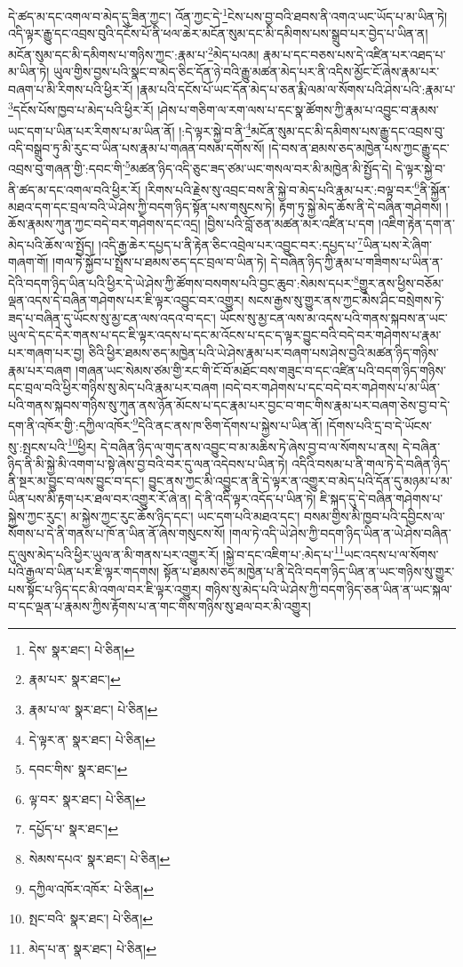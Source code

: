 དེ་ཚད་མ་དང་འགལ་བ་མེད་དུ་ཟིན་ཀྱང་། འོན་ཀྱང་དེ་\footnote{དེས་  སྣར་ཐང་།  པེ་ཅིན། }ངེས་པས་བྱ་བའི་ཐབས་ནི་འགའ་ཡང་ཡོད་པ་མ་ཡིན་ཏེ། འདི་ལྟར་རྒྱུ་དང་འབྲས་བུའི་དངོས་པོ་ནི་ཕལ་ཆེར་མངོན་སུམ་དང་མི་དམིགས་པས་སྒྲུབ་པར་བྱེད་པ་ཡིན་ན། མངོན་སུམ་དང་མི་དམིགས་པ་གཉིས་ཀྱང་:རྣམ་པ་\footnote{རྣམ་པར་  སྣར་ཐང་། }མེད་པའམ། རྣམ་པ་དང་བཅས་པས་དེ་འཛིན་པར་འཐད་པ་མ་ཡིན་ཏེ། ཡུལ་གྱིས་བྱས་པའི་སྣང་བ་མེད་ཅིང་དོན་ཉེ་བའི་རྒྱུ་མཚན་མེད་པར་ནི་འདིས་མྱོང་ངོ་ཞེས་རྣམ་པར་བཞག་པ་མི་རིགས་པའི་ཕྱིར་རོ། །རྣམ་པའི་དངོས་པོ་ཡང་དོན་མེད་པ་ཅན་རྨི་ལམ་ལ་སོགས་པའི་ཤེས་པའི་:རྣམ་པ་\footnote{རྣམ་པ་ལ་  སྣར་ཐང་།  པེ་ཅིན། }དངོས་པོས་ཁྱབ་པ་མེད་པའི་ཕྱིར་རོ། །ཤེས་པ་གཅིག་ལ་རག་ལས་པ་དང་སྣ་ཚོགས་ཀྱི་རྣམ་པ་འབྱུང་བ་རྣམས་ཡང་དག་པ་ཡིན་པར་རིགས་པ་མ་ཡིན་ནོ། །:དེ་ལྟར་སྐྱེ་བ་ནི་\footnote{དེ་ལྟར་ན་  སྣར་ཐང་།  པེ་ཅིན། }མངོན་སུམ་དང་མི་དམིགས་པས་རྒྱུ་དང་འབྲས་བུ་འདི་བསྒྲུབ་ཏུ་མི་རུང་བ་ཡིན་པས་རྣམ་པ་གཞན་བསམ་དགོས་སོ། །དེ་བས་ན་ཐམས་ཅད་མཁྱེན་པས་ཀྱང་རྒྱུ་དང་འབྲས་བུ་གཞན་གྱི་:དབང་གི་\footnote{དབང་གིས་  སྣར་ཐང་། }མཚན་ཉིད་འདི་ཅུང་ཟད་ཙམ་ཡང་གསལ་བར་མི་མཁྱེན་མི་སྤྱོད་དེ། དེ་ལྟར་སྐྱེ་བ་ནི་ཚད་མ་དང་འགལ་བའི་ཕྱིར་རོ། །རིགས་པའི་རྗེས་སུ་འབྲང་བས་ནི་སྐྱེ་བ་མེད་པའི་རྣམ་པར་:བལྟ་བར་\footnote{ལྟ་བར་  སྣར་ཐང་།  པེ་ཅིན། }ནི་སྐྱོན་མཐའ་དག་དང་བྲལ་བའི་ཡེ་ཤེས་ཀྱི་བདག་ཉིད་སྟོན་པས་གསུངས་ཏེ། རྟག་ཏུ་སྐྱེ་མེད་ཆོས་ནི་དེ་བཞིན་གཤེགས། །ཆོས་རྣམས་ཀུན་ཀྱང་བདེ་བར་གཤེགས་དང་འདྲ། །བྱིས་པའི་བློ་ཅན་མཚན་མར་འཛིན་པ་དག །འཇིག་རྟེན་དག་ན་མེད་པའི་ཆོས་ལ་སྤྱོད། །འདི་རྒྱ་ཆེར་དཔྱད་པ་ནི་རྟེན་ཅིང་འབྲེལ་པར་འབྱུང་བར་:དཔྱད་པ་\footnote{དཔྱོད་པ་  སྣར་ཐང་། }ཡིན་པས་རེ་ཞིག་གཞག་གོ། །གལ་ཏེ་སྐྱོབ་པ་སྤྲོས་པ་ཐམས་ཅད་དང་བྲལ་བ་ཡིན་ཏེ། དེ་བཞིན་ཉིད་ཀྱི་རྣམ་པ་གཟིགས་པ་ཡིན་ན་དེའི་བདག་ཉིད་ཡིན་པའི་ཕྱིར་དེ་ཡེ་ཤེས་ཀྱི་ཚོགས་བསགས་པའི་བྱང་ཆུབ་:སེམས་དཔར་\footnote{སེམས་དཔའ་  སྣར་ཐང་།  པེ་ཅིན། }གྱུར་ནས་ཕྱིས་བཅོམ་ལྡན་འདས་དེ་བཞིན་གཤེགས་པར་ཇི་ལྟར་འབྱུང་བར་འགྱུར། སངས་རྒྱས་སུ་གྱུར་ནས་ཀྱང་མེས་ཤིང་བསྲེགས་ཏེ་ཟད་པ་བཞིན་དུ་ཡོངས་སུ་མྱ་ངན་ལས་འདའ་བ་དང་། ཡོངས་སུ་མྱ་ངན་ལས་མ་འདས་པའི་གནས་སྐབས་ན་ཡང་ཡུལ་དེ་དང་དེར་གནས་པ་དང་ཇི་ལྟར་འདས་པ་དང་མ་འོངས་པ་དང་ད་ལྟར་བྱུང་བའི་བདེ་བར་གཤེགས་པ་རྣམ་པར་གཞག་པར་བྱ། ཅིའི་ཕྱིར་ཐམས་ཅད་མཁྱེན་པའི་ཡེ་ཤེས་རྣམ་པར་བཞག་པས་ཤེས་བྱའི་མཚན་ཉིད་གཉིས་རྣམ་པར་བཞག །གཞན་ཡང་སེམས་ཙམ་གྱི་རང་གི་ངོ་བོ་མཐོང་བས་གཟུང་བ་དང་འཛིན་པའི་བདག་ཉིད་གཉིས་དང་བྲལ་བའི་ཕྱིར་གཉིས་སུ་མེད་པའི་རྣམ་པར་བཞག །བདེ་བར་གཤེགས་པ་དང་བདེ་བར་གཤེགས་པ་མ་ཡིན་པའི་གནས་སྐབས་གཉིས་སུ་ཀུན་ནས་ཉོན་མོངས་པ་དང་རྣམ་པར་བྱང་བ་གང་གིས་རྣམ་པར་བཞག་ཅེས་བྱ་བ་དེ་དག་ནི་འཁོར་གྱི་:དཀྱིལ་འཁོར་\footnote{དཀྱིལ་འཁོར་འཁོར་  པེ་ཅིན། }དེའི་ནང་ནས་ཁ་ཅིག་དོགས་པ་སྐྱེས་པ་ཡིན་ནོ། །དོགས་པའི་དྲ་བ་དེ་ཡོངས་སུ་:སྤངས་པའི་\footnote{སྤང་བའི་  སྣར་ཐང་།  པེ་ཅིན། }ཕྱིར། དེ་བཞིན་ཉིད་ལ་གུད་ནས་འབྱུང་བ་མ་མཆིས་ཏེ་ཞེས་བྱ་བ་ལ་སོགས་པ་ནས། དེ་བཞིན་ཉིད་ནི་མི་སྐྱེ་མི་འགག་པ་སྟེ་ཞེས་བྱ་བའི་བར་དུ་ལན་འདེབས་པ་ཡིན་ཏེ། འདིའི་བསམ་པ་ནི་གལ་ཏེ་དེ་བཞིན་ཉིད་ནི་སྔར་མ་བྱུང་བ་ལས་བྱུང་བ་དང་། བྱུང་ནས་ཀྱང་མི་འབྱུང་ན་ནི་དེ་ལྟར་ན་འགྱུར་བ་མེད་པའི་དོན་དུ་མཉམ་པ་མ་ཡིན་པས་མི་རྟག་པར་ཐལ་བར་འགྱུར་རོ་ཞེ་ན། དེ་ནི་འདི་ལྟར་འདོད་པ་ཡིན་ཏེ། ཇི་སྐད་དུ་དེ་བཞིན་གཤེགས་པ་སྐྱེས་ཀྱང་རུང་། མ་སྐྱེས་ཀྱང་རུང་ཆོས་ཉིད་དང་། ཡང་དག་པའི་མཐའ་དང་། བསམ་གྱིས་མི་ཁྱབ་པའི་དབྱིངས་ལ་སོགས་པ་དེ་ནི་གནས་པ་ཁོ་ན་ཡིན་ནོ་ཞེས་གསུངས་སོ། །གལ་ཏེ་འདི་ཡེ་ཤེས་ཀྱི་བདག་ཉིད་ཡིན་ན་ཡེ་ཤེས་བཞིན་དུ་ལུས་མེད་པའི་ཕྱིར་ཡུལ་ན་མི་གནས་པར་འགྱུར་རོ། །སྐྱེ་བ་དང་འཇིག་པ་:མེད་པ་\footnote{མེད་པ་ན་  སྣར་ཐང་།  པེ་ཅིན། }ཡང་འདས་པ་ལ་སོགས་པའི་རྒྱལ་བ་ཡིན་པར་ཇི་ལྟར་གདགས། སྟོན་པ་ཐམས་ཅད་མཁྱེན་པ་ནི་དེའི་བདག་ཉིད་ཡིན་ན་ཡང་གཉིས་སུ་གྱུར་པས་སྟོང་པ་ཉིད་དང་མི་འགལ་བར་ཇི་ལྟར་འགྱུར། གཉིས་སུ་མེད་པའི་ཡེ་ཤེས་ཀྱི་བདག་ཉིད་ཅན་ཡིན་ན་ཡང་སྐལ་བ་དང་ལྡན་པ་རྣམས་ཀྱིས་རྟོགས་པ་ན་གང་གིས་གཉིས་སུ་ཐལ་བར་མི་འགྱུར། 